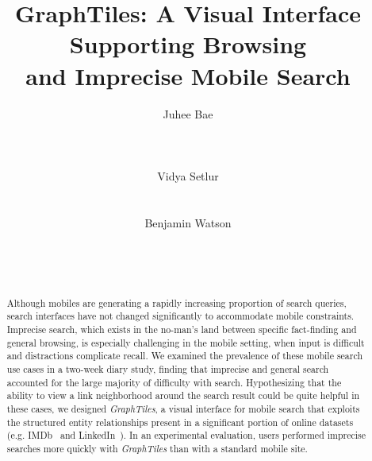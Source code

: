 \documentclass{sigchi}
\begin{document}
\title{GraphTiles: A Visual Interface Supporting Browsing \\and Imprecise Mobile Search}

\author{
  \alignauthor Juhee Bae\\
    \\
     \\
    \\
  \alignauthor Vidya Setlur\\
    \\
    \\ 
  \alignauthor Benjamin Watson\\
    \\
     \\
    \\
}


\maketitle

\toappear

\begin{abstract}
Although mobiles are generating a rapidly increasing proportion of search queries, search interfaces have not changed significantly to accommodate mobile constraints. Imprecise search, which exists in the no-man's land between specific fact-finding and general browsing, is especially challenging in the mobile setting, when input is difficult and distractions complicate recall. We examined the prevalence of these mobile search use cases in a two-week diary study, finding that imprecise and general search accounted for the large majority of difficulty with search. Hypothesizing that the ability to view a link neighborhood around the search result could be quite helpful in these cases, we designed \textit{GraphTiles}, a visual interface for mobile search that exploits the structured entity relationships present in a significant portion of online datasets (e.g. IMDb~\cite{imdb} and LinkedIn~\cite{linkedin}). In an experimental evaluation, users performed imprecise searches more quickly with \textit{GraphTiles} than with a standard mobile site. 
\end{abstract}
\end{document}
